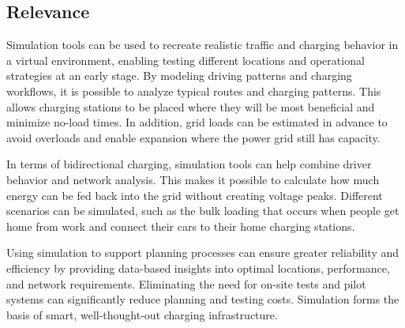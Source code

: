 \subsection{Relevance}

Simulation tools can be used to recreate realistic traffic and charging behavior in a virtual environment, enabling testing different locations and operational strategies at an early stage. By modeling driving patterns and charging workflows, it is possible to analyze typical routes and charging patterns. This allows charging stations to be placed where they will be most beneficial and minimize no-load times. In addition, grid loads can be estimated in advance to avoid overloads and enable expansion where the power grid still has capacity.

In terms of bidirectional charging, simulation tools can help combine driver behavior and network analysis. This makes it possible to calculate how much energy can be fed back into the grid without creating voltage peaks. Different scenarios can be simulated, such as the bulk loading that occurs when people get home from work and connect their cars to their home charging stations.

Using simulation to support planning processes can ensure greater reliability and efficiency by providing data-based insights into optimal locations, performance, and network requirements. Eliminating the need for on-site tests and pilot systems can significantly reduce planning and testing costs. Simulation forms the basis of smart, well-thought-out charging infrastructure.